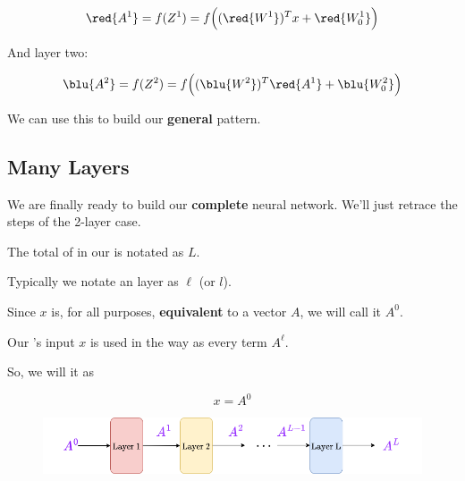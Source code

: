         \begin{equation}
            \red{A^1} = f(Z^1) = 
            f  
            \Big( 
                (\red{W^1})^T x + \red{W_0^1} 
            \Big)
        \end{equation}
        
        And layer two:
        
        \begin{equation}
            \blu{A^2} = f(Z^2) = 
            f  
            \Big( 
                (\blu{W^2})^T \red{A^1} + \blu{W_0^2} 
            \Big)
        \end{equation}
        
        We can use this to build our \textbf{general} pattern.
        
    \subsection{Many Layers}
    
        We are finally ready to build our \textbf{complete} neural network. We'll just retrace the steps of the 2-layer case.\\
        
        \begin{notation}
            The total  of  in our  is notated as $L$.
            
            Typically we notate an  layer as $\ell$ (or $l$).
        \end{notation}
        
        Since $x$ is, for all purposes, \textbf{equivalent} to a vector $A$, we will call it $A^0$.\\
        
        \begin{notation}
            Our 's input $x$ is used in the  way as every term $A^\ell$.
            
            So, we will  it as 
            
            \begin{equation*}
                x = A^0
            \end{equation*}
        \end{notation}
        
        \begin{figure}[H]
            \centering
            \includegraphics[width=140mm,scale=0.4]{images/nn_images/all_layers.png}
        \end{figure}
        
